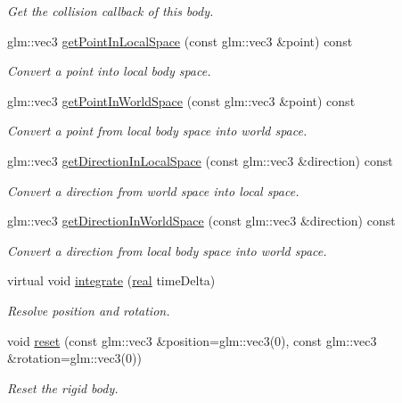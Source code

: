 \begin{DoxyCompactItemize}
\begin{DoxyCompactList}\small\item\em Get the collision callback of this body. \end{DoxyCompactList}\item 
glm\+::vec3 \mbox{\hyperlink{classr3_1_1_rigid_body_a23b72178cb04117c3b016218fefff835}{get\+Point\+In\+Local\+Space}} (const glm\+::vec3 \&point) const
\begin{DoxyCompactList}\small\item\em Convert a point into local body space. \end{DoxyCompactList}\item 
glm\+::vec3 \mbox{\hyperlink{classr3_1_1_rigid_body_a1d694ab55e5846af2d5a184b2be4c523}{get\+Point\+In\+World\+Space}} (const glm\+::vec3 \&point) const
\begin{DoxyCompactList}\small\item\em Convert a point from local body space into world space. \end{DoxyCompactList}\item 
glm\+::vec3 \mbox{\hyperlink{classr3_1_1_rigid_body_a621796b0cd49499e10b158096ae5c938}{get\+Direction\+In\+Local\+Space}} (const glm\+::vec3 \&direction) const
\begin{DoxyCompactList}\small\item\em Convert a direction from world space into local space. \end{DoxyCompactList}\item 
glm\+::vec3 \mbox{\hyperlink{classr3_1_1_rigid_body_aa51f55f7c344d1d7754b91b565cb6eac}{get\+Direction\+In\+World\+Space}} (const glm\+::vec3 \&direction) const
\begin{DoxyCompactList}\small\item\em Convert a direction from local body space into world space. \end{DoxyCompactList}\item 
virtual void \mbox{\hyperlink{classr3_1_1_rigid_body_a82945a23582ddfd4bad5c9b51847f9a4}{integrate}} (\mbox{\hyperlink{namespacer3_ab2016b3e3f743fb735afce242f0dc1eb}{real}} time\+Delta)
\begin{DoxyCompactList}\small\item\em Resolve position and rotation. \end{DoxyCompactList}\item 
void \mbox{\hyperlink{classr3_1_1_rigid_body_a87ecb0826050e8dc9b9a9a8eaf0fff66}{reset}} (const glm\+::vec3 \&position=glm\+::vec3(0), const glm\+::vec3 \&rotation=glm\+::vec3(0))
\begin{DoxyCompactList}\small\item\em Reset the rigid body. \end{DoxyCompactList}\end{DoxyCompactItemize}
